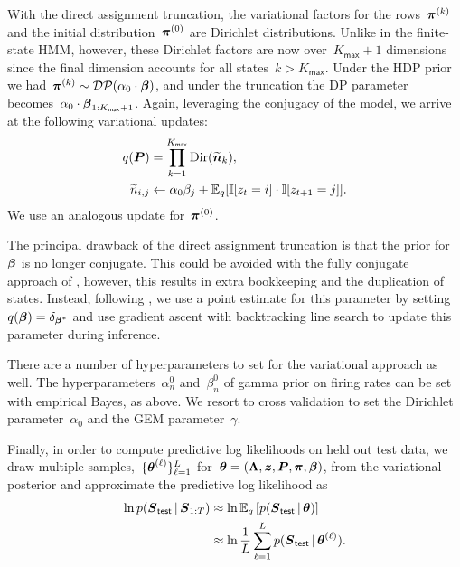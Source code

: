 With the direct assignment truncation, the variational factors for the
rows~$\boldsymbol{\pi}^{(k)}$ and the initial distribution~$\boldsymbol{\pi}^{(0)}$ are
Dirichlet distributions. Unlike in the finite-state HMM, however,
these Dirichlet factors are now over~${K_{\mathsf{max}}+1}$ dimensions since the final
dimension accounts for all states~${k>K_{\mathsf{max}}}$. Under the HDP prior we
had~${\boldsymbol{\pi}^{(k)} \sim \mathcal{DP}(\alpha_0 \cdot \boldsymbol{\beta})}$, and under the
truncation the DP parameter becomes~$\alpha_0 \cdot
\boldsymbol{\beta}_{1:K_{\mathsf{max}}+1}$.
Again, leveraging the conjugacy of the model, we arrive at the
following variational updates:
\begin{align*}
q(\boldsymbol{P}) &= \prod_{k=1}^{K_{\mathsf{max}}} \mathrm{Dir}(\widetilde{\boldsymbol{n}}_k), \\
\widetilde{n}_{i,j} &\leftarrow \alpha_0 \beta_j + \mathbb{E}_q[\mathbb{I}[z_t=i]\cdot\mathbb{I}[z_{t+1}=j]].
\end{align*}
We use an analogous update for~$\boldsymbol{\pi}^{(0)}$.

The principal drawback of the direct assignment truncation is that the
prior for~$\boldsymbol{\beta}$ is no longer conjugate. This could be avoided with
the fully conjugate approach of \citep{Hoffman13}, however, this
results in extra bookkeeping and the duplication of states. Instead,
following \citep{Johnson14, Bryant12, Liang07}, we use a point
estimate for this parameter by setting~${q(\boldsymbol{\beta})=\delta_{\boldsymbol{\beta}^*}}$
and use gradient ascent with backtracking line search to update this
parameter during inference.

There are a number of hyperparameters to set for the variational
approach as well. The hyperparameters~$\alpha_n^0$ and~$\beta_n^0$ of
gamma prior on firing rates can be set with empirical Bayes, as
above. We resort to cross validation to set the Dirichlet
parameter~$\alpha_0$ and the GEM parameter~$\gamma$.
 

Finally, in order to compute predictive log likelihoods on held out
test data, we draw multiple samples,~$\{\boldsymbol{\theta}^{(\ell)}\}_{\ell=1}^L$ for~$\boldsymbol{\theta}=(\boldsymbol{\Lambda}, \boldsymbol{z}, \boldsymbol{P},
\boldsymbol{\pi}, \boldsymbol{\beta})$, from the variational posterior and
approximate the predictive log likelihood as
\begin{align}
\ln p(\boldsymbol{S}_{\mathsf{test}} \,|\, \boldsymbol{S}_{1:T}) &\approx \ln \mathbb{E}_q\left[p(\boldsymbol{S}_{\mathsf{test}} \,|\, \boldsymbol{\theta})\right] \\
\nonumber &\approx \ln \frac{1}{L} \sum_{\ell=1}^L p(\boldsymbol{S}_{\mathsf{test}} \,|\, \boldsymbol{\theta}^{(\ell)}).
\end{align}

